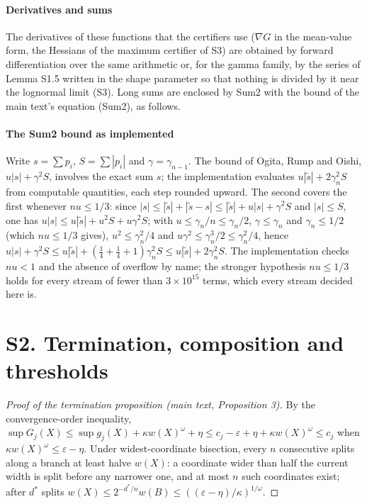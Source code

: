 \documentclass[preprint,11pt,a4paper]{elsarticle}
\theoremstyle{definition}
\begin{document}
\paragraph{Derivatives and sums} The derivatives of these functions that the certifiers use ($\nabla G$ in the mean-value form, the Hessians of the maximum certifier of S3) are obtained by forward differentiation over the same arithmetic or, for the gamma family, by the series of Lemma S1.5 written in the shape parameter so that nothing is divided by it near the lognormal limit (S3). Long sums are enclosed by Sum2 with the bound of the main text's equation (Sum2), as follows.

\paragraph{The Sum2 bound as implemented} Write $s=\sum p_i$, $S=\sum|p_i|$ and $\gamma=\gamma_{n-1}$. The bound of Ogita, Rump and Oishi, $u|s|+\gamma^2S$, involves the exact sum $s$; the implementation evaluates $u|\tilde s|+2\gamma_n^2S$ from computable quantities, each step rounded upward. The second covers the first whenever $nu\le1/3$: since $|s|\le|\tilde s|+|\tilde s-s|\le|\tilde s|+u|s|+\gamma^2S$ and $|s|\le S$, one has $u|s|\le u|\tilde s|+u^2S+u\gamma^2S$; with $u\le\gamma_n/n\le\gamma_n/2$, $\gamma\le\gamma_n$ and $\gamma_n\le1/2$ (which $nu\le1/3$ gives), $u^2\le\gamma_n^2/4$ and $u\gamma^2\le\gamma_n^3/2\le\gamma_n^2/4$, hence $u|s|+\gamma^2S\le u|\tilde s|+(\tfrac14+\tfrac14+1)\gamma_n^2S\le u|\tilde s|+2\gamma_n^2S$. The implementation checks $nu<1$ and the absence of overflow by name; the stronger hypothesis $nu\le1/3$ holds for every stream of fewer than $3\times10^{15}$ terms, which every stream decided here is.

\section*{S2. Termination, composition and thresholds}

\begin{proof}[Proof of the termination proposition (main text, Proposition 3)]
By the convergence-order inequality, $\sup G_j(X)\le\sup g_j(X)+\kappa w(X)^\omega+\eta\le c_j-\varepsilon+\eta+\kappa w(X)^\omega\le c_j$ when $\kappa w(X)^\omega\le\varepsilon-\eta$. Under widest-coordinate bisection, every $n$ consecutive splits along a branch at least halve $w(X)$: a coordinate wider than half the current width is split before any narrower one, and at most $n$ such coordinates exist; after $d^*$ splits $w(X)\le 2^{-d^*/n}w(B)\le((\varepsilon-\eta)/\kappa)^{1/\omega}$.
\end{proof}
\end{document}
